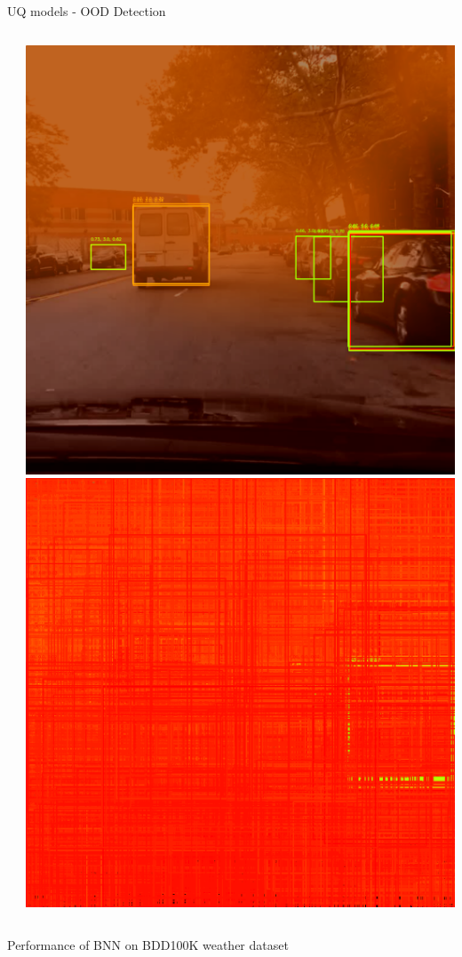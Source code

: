 \documentclass[10pt, aspectratio=169]{beamer}
\begin{document}
\begin{frame}[allowframebreaks]{UQ models - OOD Detection}
\begin{columns}
\begin{column}{.2\textwidth}
            \end{column}
            \begin{column}{.2\textwidth}
                \includegraphics[width=\textwidth]{images/uq_weathers/BNN_variances4.png}
                \includegraphics[width=\textwidth]{images/uq_weathers/flipout_entropies_all4.png}
            \end{column}
        \end{columns}
        \begin{center}
            Performance of BNN on BDD100K weather dataset
        \end{center}
        


\end{frame}
\end{document}
